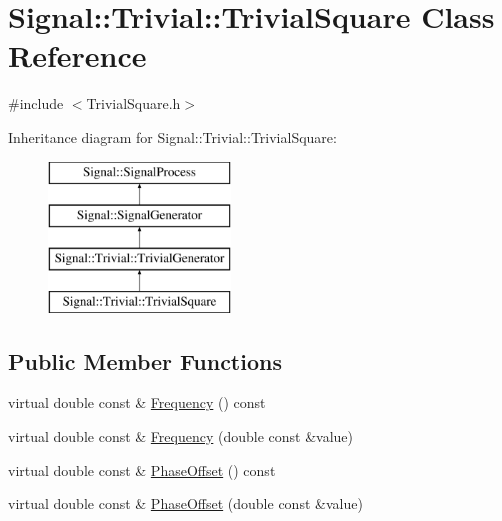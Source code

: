 \hypertarget{classSignal_1_1Trivial_1_1TrivialSquare}{\section{Signal\+:\+:Trivial\+:\+:Trivial\+Square Class Reference}
\label{classSignal_1_1Trivial_1_1TrivialSquare}
}


{\ttfamily \#include $<$Trivial\+Square.\+h$>$}

Inheritance diagram for Signal\+:\+:Trivial\+:\+:Trivial\+Square\+:\begin{figure}[H]
\begin{center}
\leavevmode
\includegraphics[height=4.000000cm]{classSignal_1_1Trivial_1_1TrivialSquare}
\end{center}
\end{figure}
\subsection*{Public Member Functions}
\begin{DoxyCompactItemize}
\item 
virtual double const \& \hyperlink{classSignal_1_1SignalGenerator_a96af42ee68f94e9b04d034fd68b73ecd}{Frequency} () const 
\item 
virtual double const \& \hyperlink{classSignal_1_1SignalGenerator_af83b532bf3ddc3637c2fd7a1dfd095cb}{Frequency} (double const \&value)
\item 
virtual double const \& \hyperlink{classSignal_1_1SignalGenerator_ac2538ec946f001e394d2416fda698d1c}{Phase\+Offset} () const 
\item 
virtual double const \& \hyperlink{classSignal_1_1SignalGenerator_ac6a103ff72beaa338f6d18c812522d78}{Phase\+Offset} (double const \&value)
\end{DoxyCompactItemize}
